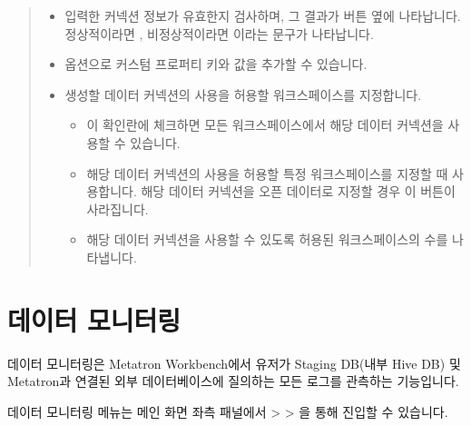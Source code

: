 \documentclass[letterpaper,10pt,english]{sphinxmanual}
\begin{document}
\begin{quote}
\begin{itemize}
\item {} 
 입력한 커넥션 정보가 유효한지 검사하며, 그 결과가 버튼 옆에 나타납니다. 정상적이라면 , 비정상적이라면 이라는 문구가 나타납니다.

\item {} 
 옵션으로 커스텀 프로퍼티 키와 값을 추가할 수 있습니다.

\item {} 
 생성할 데이터 커넥션의 사용을 허용할 워크스페이스를 지정합니다.
\begin{itemize}
\item {} 
 이 확인란에 체크하면 모든 워크스페이스에서 해당 데이터 커넥션을 사용할 수 있습니다.

\item {} 
 해당 데이터 커넥션의 사용을 허용할 특정 워크스페이스를 지정할 때 사용합니다. 해당 데이터 커넥션을 오픈 데이터로 지정할 경우 이 버튼이 사라집니다.

\item {} 
 해당 데이터 커넥션을 사용할 수 있도록 허용된 워크스페이스의 수를 나타냅니다.

\end{itemize}

\end{itemize}
\end{quote}


\section{데이터 모니터링}
\label{\detokenize{discovery/part02/data_monitoring:id1}}\label{\detokenize{discovery/part02/data_monitoring::doc}}
데이터 모니터링은 Metatron Workbench에서 유저가 Staging DB(내부 Hive DB) 및 Metatron과 연결된 외부 데이터베이스에 질의하는 모든 로그를 관측하는 기능입니다.

데이터 모니터링 메뉴는 메인 화면 좌측 패널에서  \textgreater{}  \textgreater{} 을 통해 진입할 수 있습니다.
\begin{quote}

\begin{figure}[H]
\centering

\noindent{}
\end{figure}
\end{quote}
\end{document}
